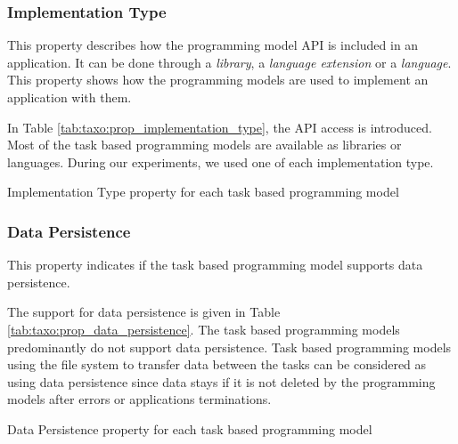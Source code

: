 \subsubsection{Implementation Type}
This property describes how the programming model API is included in an application.
It can be done through a \textit{library}, a \textit{language extension} or a \textit{language}.
This property shows how the programming models are used to implement an application with them.

In Table \ref{tab:taxo:prop_implementation_type}, the API access is introduced.
Most of the task based programming models are available as libraries or languages.
During our experiments, we used one of each implementation type.

\begin{table}[H]
	\caption{Implementation Type property for each task based programming model \label{tab:taxo:prop_implementation_type}}
	\centering
	\begin{multicols}{2}
		

		
	\end{multicols}
\end{table}

\subsubsection{Data Persistence}
This property indicates if the task based programming model supports data persistence.

The support for data persistence is given in Table \ref{tab:taxo:prop_data_persistence}.
The task based programming models predominantly do not support data persistence.
Task based programming models using the file system to transfer data between the tasks can be considered as using data persistence since data stays if it is not deleted by the programming models after errors or applications terminations.

\begin{table}[H]
	\caption{Data Persistence property for each task based programming model \label{tab:taxo:prop_data_persistence}}
	\centering
	\begin{multicols}{2}
		

		
	\end{multicols}
\end{table}

